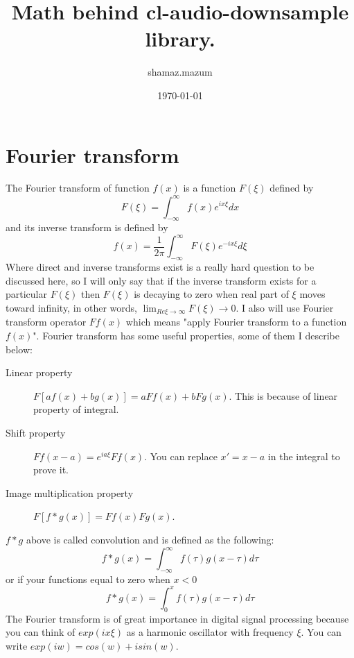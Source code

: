 \documentclass[a4paper,11pt,fleqn]{article}
\date{\today}
\author{shamaz.mazum}
\title{Math behind cl-audio-downsample library.}
\begin{document}
\maketitle
\section{Fourier transform}
The Fourier transform of function $f(x)$ is a function $F(\xi)$ defined by
\begin{equation}
F(\xi) = \int_{-\infty}^{\infty} f(x)e^{ix\xi}dx
\end{equation}
and its inverse transform is defined by 
\begin{equation}
f(x) = \frac{1}{2\pi}\int_{-\infty}^{\infty} F(\xi)e^{-ix\xi}d\xi
\end{equation}
Where direct and inverse transforms exist is a really hard question to be discussed here, so I will only say
that if the inverse transform exists for a particular $F(\xi)$ then $F(\xi)$ is decaying to zero when 
real part of $\xi$ moves toward infinity, in other words, $\lim_{Re \xi \to \infty} F(\xi) \to 0$.
I also will use Fourier transform operator $Ff(x)$ which means "apply Fourier transform to a function $f(x)$".
Fourier transform has some useful properties, some of them I describe below:
\begin{description}
\item[Linear property] $F[af(x)+bg(x)] = aFf(x) + bFg(x)$. This is because of linear property of integral.
\item[Shift property] $Ff(x-a) = e^{ia\xi}Ff(x)$. You can replace $x' = x - a$ in the integral to prove it.
\item[Image multiplication property] $F[f*g(x)] = Ff(x)Fg(x)$.
\end{description}
$f*g$ above is called convolution and is defined as the following:
\begin{equation}
f*g(x) = \int_{-\infty}^{\infty}f(\tau)g(x-\tau)d\tau
\end{equation}
or if your functions equal to zero when $x<0$ 
\begin{equation} \label{convolve2}
f*g(x) = \int_{0}^{x}f(\tau)g(x-\tau)d\tau
\end{equation}
The Fourier transform is of great importance in digital signal processing because you can think of $exp(ix\xi)$
as a harmonic oscillator with frequency $\xi$. You can write $exp(iw) = cos(w) + isin(w)$.
\end{document}
